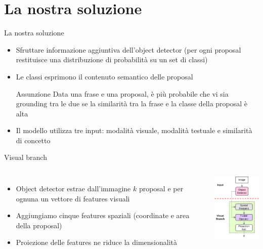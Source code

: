 \documentclass{beamer}
\begin{document}
\section{La nostra soluzione}

\begin{frame}{La nostra soluzione}
  \begin{itemize}
    \item Sfruttare informazione aggiuntiva dell'object detector (per
    ogni proposal restituisce una \alert{distribuzione di probabilità}
    su un set di classi)
    \item Le classi esprimono il \alert{contenuto semantico} delle
    proposal
    \vspace{0.5cm}
    \begin{alertblock}{Assunzione}
      Data una frase e una proposal, è più probabile che vi sia
      grounding tra le due se la \alert{similarità} tra la frase e la
      classe della proposal è alta
    \end{alertblock}
    \vspace{0.5cm}
    \item Il modello utilizza \alert{tre input}: modalità visuale,
    modalità testuale e similarità di concetto 
  \end{itemize}
\end{frame}

\begin{frame}{Visual branch}
  \begin{columns}
      \begin{itemize}
        \item Object detector estrae dall'immagine $k$ proposal e per
        ognuna un vettore di \alert{features visuali}
        \item Aggiungiamo cinque \alert{features spaziali} (coordinate e
        area della proposal)
        \item \alert{Proiezione} delle features ne riduce la dimensionalità
      \end{itemize}
      \centering
      \includegraphics[width=3.5cm]{images/visual-branch.png}
  \end{columns}
\end{frame}
\end{document}
